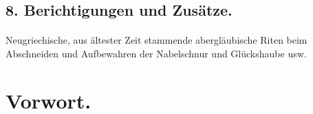 \documentclass[a4paper, 11pt, oneside]{article}
\begin{document}
\subsection*{8. Berichtigungen und Zusätze.}
\paragraph{}
Neugriechische, aus ältester Zeit stammende abergläubische Riten beim Abschneiden und Aufbewahren der Nabelschnur und Glückshaube usw.
\clearpage
\section*{Vorwort.}
\paragraph{}
\end{document}
